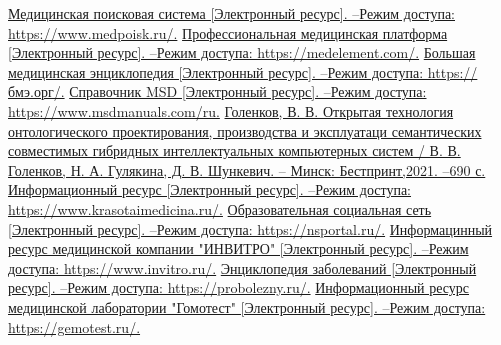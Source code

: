 %
%
%

\begin{thebibliography}{99}
\href{https://www.medpoisk.ru/}{Медицинская поисковая система [Электронный ресурс]. --Режим доступа: https://www.medpoisk.ru/.}
\href{https://medelement.com/}{Профессиональная медицинская платформа [Электронный ресурс]. --Режим доступа: https://medelement.com/.}
\href{https://бмэ.орг/}{Большая медицинская энциклопедия [Электронный ресурс]. --Режим доступа: https://бмэ.орг/.}
\href{https://www.msdmanuals.com/ru}{Справочник MSD [Электронный ресурс]. --Режим доступа: https://www.msdmanuals.com/ru.}
\href{}{Голенков, В. В. Открытая технология онтологического проектирования, производства и эксплуатаци семантических совместимых гибридных интеллектуальных компьютерных систем / В. В. Голенков, Н. А. Гулякина, Д. В. Шункевич. -- Минск: Бестпринт,2021. --690 с.}
\href{https://www.krasotaimedicina.ru/}{Информационный ресурс [Электронный ресурс]. --Режим доступа: https://www.krasotaimedicina.ru/.}
\href{https://nsportal.ru/}{Образовательная социальная сеть [Электронный ресурс]. --Режим доступа: https://nsportal.ru/.}
\href{https://www.invitro.ru/}{Информацинный ресурс медицинской компании "ИНВИТРО" [Электронный ресурс]. --Режим доступа: https://www.invitro.ru/.}
\href{https://probolezny.ru/}{Энциклопедия заболеваний [Электронный ресурс]. --Режим доступа: https://probolezny.ru/.}
\href{https://gemotest.ru/}{Информационный ресурс медицинской лаборатории "Гомотест" [Электронный ресурс]. --Режим доступа: https://gemotest.ru/.}
\end{thebibliography}
	   